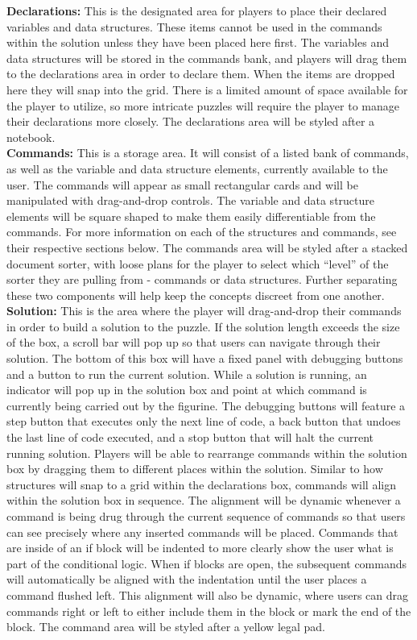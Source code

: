 \textbf{Declarations:}
This is the designated area for players to place their declared variables and data structures. These items cannot 
be used in the commands within the solution unless they have been placed here first. The variables and data 
structures will be stored in the commands bank, and players will drag them to the declarations area in order to 
declare them. When the items are dropped here they will snap into the grid. There is a limited amount of space 
available for the player to utilize, so more intricate puzzles will require the player to manage their declarations 
more closely. The declarations area will be styled after a notebook.\\

\textbf{Commands:}
This is a storage area. It will consist of a listed bank of commands, as well as the variable and data structure 
elements, currently available to the user. The commands will appear as small rectangular cards and will be 
manipulated with drag-and-drop controls. The variable and data structure elements will be square shaped to 
make them easily differentiable from the commands. For more information on each of the structures and 
commands, see their respective sections below. The commands area will be styled after a stacked document 
sorter, with loose plans for the player to select which “level” of the sorter they are pulling from - commands 
or data structures. Further separating these two components will help keep the concepts discreet from one 
another.\\

\textbf{Solution:}
This is the area where the player will drag-and-drop their commands in order to build a solution to the puzzle. 
If the solution length exceeds the size of the box, a scroll bar will pop up so that users can navigate through 
their solution. The bottom of this box will have a fixed panel with debugging buttons and a button to run the 
current solution. While a solution is running, an indicator will pop up in the solution box and point at which 
command is currently being carried out by the figurine. The debugging buttons will feature a step button that 
executes only the next line of code, a back button that undoes the last line of code executed, and a stop button 
that will halt the current running solution. Players will be able to rearrange commands within the solution box by 
dragging them to different places within the solution. Similar to how structures will snap to a grid within the 
declarations box, commands will align within the solution box in sequence. The alignment will be dynamic 
whenever a command is being drug through the current sequence of commands so that users can see precisely 
where any inserted commands will be placed. Commands that are inside of an if block will be indented to more 
clearly show the user what is part of the conditional logic. When if blocks are open, the subsequent commands 
will automatically be aligned with the indentation until the user places a command flushed left. This alignment will 
also be dynamic, where users can drag commands right or left to either include them in the block or mark the 
end of the block. The command area will be styled after a yellow legal pad.\\

